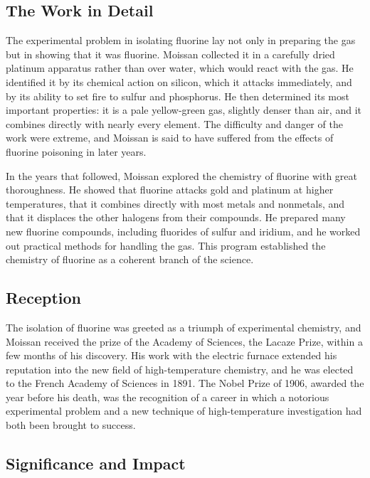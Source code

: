 \subsection*{The Work in Detail}

The experimental problem in isolating fluorine lay not only in preparing the gas but in showing that it was fluorine. Moissan collected it in a carefully dried platinum apparatus rather than over water, which would react with the gas. He identified it by its chemical action on silicon, which it attacks immediately, and by its ability to set fire to sulfur and phosphorus. He then determined its most important properties: it is a pale yellow-green gas, slightly denser than air, and it combines directly with nearly every element. The difficulty and danger of the work were extreme, and Moissan is said to have suffered from the effects of fluorine poisoning in later years.

In the years that followed, Moissan explored the chemistry of fluorine with great thoroughness. He showed that fluorine attacks gold and platinum at higher temperatures, that it combines directly with most metals and nonmetals, and that it displaces the other halogens from their compounds. He prepared many new fluorine compounds, including fluorides of sulfur and iridium, and he worked out practical methods for handling the gas. This program established the chemistry of fluorine as a coherent branch of the science.

\subsection*{Reception}

The isolation of fluorine was greeted as a triumph of experimental chemistry, and Moissan received the prize of the Academy of Sciences, the Lacaze Prize, within a few months of his discovery. His work with the electric furnace extended his reputation into the new field of high-temperature chemistry, and he was elected to the French Academy of Sciences in 1891. The Nobel Prize of 1906, awarded the year before his death, was the recognition of a career in which a notorious experimental problem and a new technique of high-temperature investigation had both been brought to success.

\subsection*{Significance and Impact}

